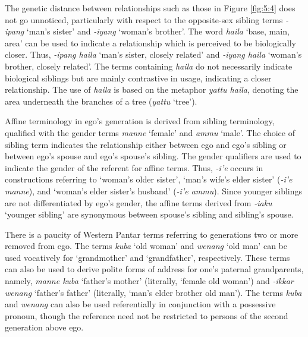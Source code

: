 The genetic distance between relationships such as those in Figure \ref{fig:5:4} does not go unnoticed, particularly with respect to the opposite-sex sibling terms \textit{-ipang} `man's sister' and \textit{-iyang} `woman's brother'. The word \textit{haila} `base, main, area' can be used to indicate a relationship which is perceived to be biologically closer. Thus, \textit{-ipang haila} `man's sister, closely related' and \textit{-iyang haila} `woman's brother, closely related'. The terms containing \textit{haila} do not necessarily indicate biological siblings but are mainly contrastive in usage, indicating a closer relationship. The use of \textit{haila} is based on the metaphor \textit{yattu haila}, denoting the area underneath the branches of a tree (\textit{yattu} `tree').

Affine terminology in ego's generation is derived from sibling terminology, qualified with the gender terms \textit{manne} `female' and \textit{ammu} `male'. The choice of sibling term indicates the relationship either between ego and ego's sibling or between ego's spouse and ego's spouse's sibling. The gender qualifiers are used to indicate the gender of the referent for affine terms. Thus, \textit{-i'e} occurs in constructions referring to `woman's older sister', `man's wife's elder sister' (\textit{-i'e manne}), and `woman's elder sister's husband' (\textit{-i'e ammu}). Since younger siblings are not differentiated by ego's gender, the affine terms derived from \textit{-iaku} `younger sibling' are synonymous between spouse's sibling and sibling's spouse.

There is a paucity of Western Pantar terms referring to generations two or more removed from ego. The terms \textit{kuba} `old woman' and \textit{wenang} `old man' can be used vocatively for `grandmother' and `grandfather', respectively. These terms can also be used to derive polite forms of address for one's paternal grandparents, namely, \textit{manne kuba} `father's mother' (literally, `female old woman') and \textit{-ikkar wenang} `father's father' (literally, `man's elder brother old man'). The terms \textit{kuba} and \textit{wenang} can also be used referentially in conjunction with a possessive pronoun, though the reference need not be restricted to persons of the second generation above ego.




